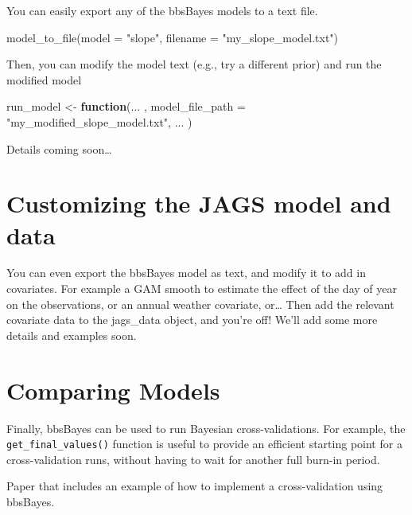 \documentclass[
]{book}
\newenvironment{Shaded}{\begin{snugshade}}{\end{snugshade}}
\newcommand{\AttributeTok}[1]{\textcolor[rgb]{0.77,0.63,0.00}{#1}}
\newcommand{\ControlFlowTok}[1]{\textcolor[rgb]{0.13,0.29,0.53}{\textbf{#1}}}
\newcommand{\FunctionTok}[1]{\textcolor[rgb]{0.00,0.00,0.00}{#1}}
\newcommand{\NormalTok}[1]{#1}
\newcommand{\OtherTok}[1]{\textcolor[rgb]{0.56,0.35,0.01}{#1}}
\newcommand{\StringTok}[1]{\textcolor[rgb]{0.31,0.60,0.02}{#1}}
\begin{document}
You can easily export any of the bbsBayes models to a text file.

\begin{Shaded}
\begin{Highlighting}[]
\FunctionTok{model\_to\_file}\NormalTok{(}\AttributeTok{model =} \StringTok{"slope"}\NormalTok{,}
              \AttributeTok{filename =} \StringTok{"my\_slope\_model.txt"}\NormalTok{)}
\end{Highlighting}
\end{Shaded}

Then, you can modify the model text (e.g., try a different prior) and run the modified model

\begin{Shaded}
\begin{Highlighting}[]
\NormalTok{run\_model }\OtherTok{\textless{}{-}} \ControlFlowTok{function}\NormalTok{(... ,}
                      \AttributeTok{model\_file\_path =} \StringTok{"my\_modified\_slope\_model.txt"}\NormalTok{,}
\NormalTok{                      ... )}
\end{Highlighting}
\end{Shaded}

Details coming soon\ldots{}

\hypertarget{customizing-the-jags-model-and-data}{%
\section{Customizing the JAGS model and data}\label{customizing-the-jags-model-and-data}}

You can even export the bbsBayes model as text, and modify it to add in covariates. For example a GAM smooth to estimate the effect of the day of year on the observations, or an annual weather covariate, or\ldots{} Then add the relevant covariate data to the jags\_data object, and you're off! We'll add some more details and examples soon.

\hypertarget{comparing-models}{%
\section{Comparing Models}\label{comparing-models}}

Finally, bbsBayes can be used to run Bayesian cross-validations. For example, the \texttt{get\_final\_values()} function is useful to provide an efficient starting point for a cross-validation runs, without having to wait for another full burn-in period.

Paper that includes an example of how to implement a cross-validation using bbsBayes.
\end{document}
